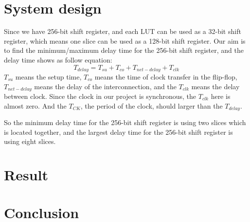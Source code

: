\documentclass[12pt]{article}
\begin{document}
\section{System design}  \label{a3}
Since we have 256-bit shift register, and each LUT can be used as a 32-bit shift register, which means one slice can be used as a 128-bit shift register. Our aim is to find the minimum/maximum delay time for the 256-bit shift register, and the delay time shows as follow equation:
$$T_{delay}=T_{su}+T_{co}+T_{net-delay}+T_{clk}$$
$T_{su}$ means the setup time, $T_{co}$ means the time of clock transfer in the flip-flop, $T_{net-delay}$ means the delay of the interconnection, and the $T_{clk}$ means the delay between clock. Since the clock in our project is synchronous, the $T_{clk}$ here is almost zero. And the $T_{CK}$, the period of the clock, should larger than the $T_{delay}$.

So the minimum delay time for the 256-bit shift register is using two slices which is located together, and the largest delay time for the 256-bit shift register is using eight slices.
 

\section{Result}  \label{a4}

\section{Conclusion}  \label{a5}

\newpage


\end{document}
